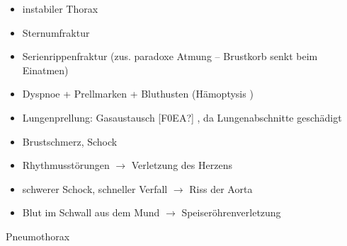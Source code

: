 \documentclass{article}
\begin{document}
\begin{itemize}
\item {\mdseries
instabiler Thorax}

\end{itemize}
\begin{itemize}
\item {\mdseries
Sternumfraktur}

\item {\mdseries
Serienrippenfraktur (zus. paradoxe Atmung --  Brustkorb senkt beim
Einatmen)}

\end{itemize}
\begin{itemize}
\item {\mdseries
Dyspnoe + Prellmarken +  Bluthusten  (H\"amoptysis )}

\end{itemize}
\begin{itemize}
\item {\mdseries
Lungenprellung: Gasaustausch [F0EA?] , da  Lungenabschnitte
gesch\"adigt}

\end{itemize}
\begin{itemize}
\item {\mdseries
Brustschmerz, Schock }

\end{itemize}
\begin{itemize}
\item {\mdseries
Rhythmusst\"orungen ${\rightarrow}$ Verletzung des  Herzens}

\item {\mdseries
schwerer Schock, schneller Verfall ${\rightarrow}$ Riss der  Aorta}

\item {\mdseries
Blut im Schwall aus dem Mund ${\rightarrow}$  Speiser\"ohrenverletzung}

\end{itemize}
{\mdseries\color[rgb]{0.0,0.0,0.5019608}
Pneumothorax}
\end{document}
